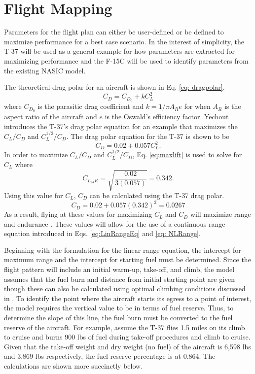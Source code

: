 \section{Flight Mapping}
Parameters for the flight plan can either be user-defined or be defined to maximize performance for a best case scenario. In the interest of simplicity, the T-37 will be used as a general example for how parameters are extracted for maximizing performance and the F-15C will be used to identify parameters from the existing NASIC model. \par
The theoretical drag polar for an aircraft is shown in Eq. \ref{eq: dragpolar}.
\begin{equation}
    C_D = C_{D_0} + kC_L^2
    \label{eq: dragpolar}
\end{equation}
where $C_{D_0}$ is the parasitic drag coefficient and $k = 1/\pi A_Re$ for when $A_R$ is the aspect ratio of the aircraft and $e$ is the Oswald's efficiency factor. Yechout \cite{IntroACMechanics} introduces the T-37's drag polar equation for an example that maximizes the $C_L/C_D$ and $C_L^{1/2}/C_D$. The drag polar equation for the T-37 is shown to be  
\begin{equation*}
    C_D = 0.02 + 0.057C_L^2.
\end{equation*}
In order to maximize $C_L/C_D$ and $C_L^{1/2}/C_D$, Eq. \ref{eq:maxlift} is used to solve for $C_L$ where
\begin{equation*}
    C_{L_MR} = \sqrt{\dfrac{0.02}{3(0.057)}} = 0.342.
\end{equation*}
Using this value for $C_L$, $C_D$ can be calculated using the T-37 drag polar.
\begin{equation*}
    C_D = 0.02 + 0.057(0.342)^2 = 0.0267
\end{equation*}
As a result, flying at these values for maximizing $C_L$ and $C_D$ will maximize range and endurance \cite{IntrotoAero}. These values will allow for the use of a continuous range equation introduced in Eqs. \ref{eq:LinRangeEq} and \ref{eq: NLRange}. \par
Beginning with the formulation for the linear range equation, the intercept for maximum range and the intercept for starting fuel must be determined. Since the flight pattern will include an initial warm-up, take-off, and climb, the model assumes that the fuel burn and distance from initial starting point are given though these can also be calculated using optimal climbing conditions discussed in \cite{IntroACMechanics}. To identify the point where the aircraft starts its egress to a point of interest, the model requires the vertical value to be in terms of fuel reserve. Thus, to determine the slope of this line, the fuel burn must be converted to the fuel reserve of the aircraft. For example, assume the T-37 flies 1.5 miles on its climb to cruise and burns 900 lbs of fuel during take-off procedures and climb to cruise. Given that the take-off weight and dry weight (no fuel) of the aircraft is 6,598 lbs and 3,869 lbs respectively, the fuel reserve percentage is at 0.864. The calculations are shown more succinctly below.
